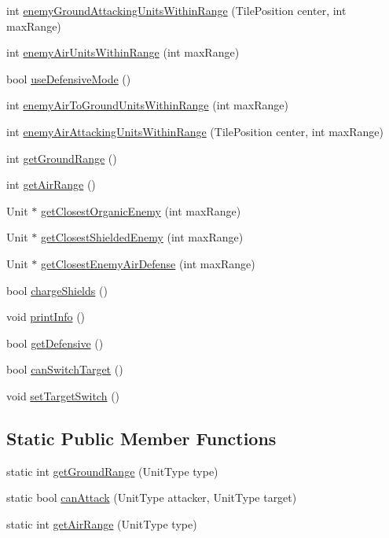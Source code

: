 \begin{DoxyCompactItemize}
\item 
int \hyperlink{class_unit_agent_a37ef25c400136addc69c27b6b1fa50f7}{enemy\-Ground\-Attacking\-Units\-Within\-Range} (Tile\-Position center, int max\-Range)
\item 
int \hyperlink{class_unit_agent_a7f46c73be71e6ce6a663f1441c8c44ac}{enemy\-Air\-Units\-Within\-Range} (int max\-Range)
\item 
bool \hyperlink{class_unit_agent_a437c0d7464d2108f144870601eab846d}{use\-Defensive\-Mode} ()
\item 
int \hyperlink{class_unit_agent_a756bc0ba745bb6407c9c4768115bc423}{enemy\-Air\-To\-Ground\-Units\-Within\-Range} (int max\-Range)
\item 
int \hyperlink{class_unit_agent_a19541a26080d312f6e6f581a02e6be64}{enemy\-Air\-Attacking\-Units\-Within\-Range} (Tile\-Position center, int max\-Range)
\item 
int \hyperlink{class_unit_agent_a181393d4f4cba15748ecfb7fe99976f2}{get\-Ground\-Range} ()
\item 
int \hyperlink{class_unit_agent_a16e43f6db50a3975814989a978300c7b}{get\-Air\-Range} ()
\item 
Unit $\ast$ \hyperlink{class_unit_agent_a3cc980a97acd45d81ae0380efc4314cd}{get\-Closest\-Organic\-Enemy} (int max\-Range)
\item 
Unit $\ast$ \hyperlink{class_unit_agent_a1577c8c5e268a04bca26f55e0bcaf711}{get\-Closest\-Shielded\-Enemy} (int max\-Range)
\item 
Unit $\ast$ \hyperlink{class_unit_agent_a3431716617e28a4dc9f4edfec9dccfbe}{get\-Closest\-Enemy\-Air\-Defense} (int max\-Range)
\item 
bool \hyperlink{class_unit_agent_add5fe982441f8eb3080948d136aaf808}{charge\-Shields} ()
\item 
void \hyperlink{class_unit_agent_a3f339a7aed3a5c77b8ba434411fd023f}{print\-Info} ()
\item 
bool \hyperlink{class_unit_agent_a0138fb142342db79cdc41412d2d87cba}{get\-Defensive} ()
\item 
bool \hyperlink{class_unit_agent_a4336c5394d63dfcbb930ef26900a4cfb}{can\-Switch\-Target} ()
\item 
void \hyperlink{class_unit_agent_a890cb711644e6b5c0f2eb3d4773c502d}{set\-Target\-Switch} ()
\end{DoxyCompactItemize}
\subsection*{Static Public Member Functions}
\begin{DoxyCompactItemize}
\item 
static int \hyperlink{class_unit_agent_ae7a2a86698e8d3dd0dac5b95993988fd}{get\-Ground\-Range} (Unit\-Type type)
\item 
static bool \hyperlink{class_unit_agent_a69342c2c297ddbc623c3fffd8da26d8c}{can\-Attack} (Unit\-Type attacker, Unit\-Type target)
\item 
static int \hyperlink{class_unit_agent_a4f076aa1c5f85dadca80838bf5e842f3}{get\-Air\-Range} (Unit\-Type type)
\end{DoxyCompactItemize}
